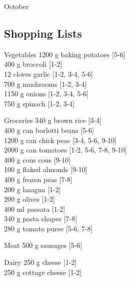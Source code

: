 \begin{menu}{October}
    \subsection*{Shopping Lists}
      \begin{shoppinglist}{Vegetables}
      1200 g baking potatoes {\scriptsize[5-6]}\\
      400 g broccoli {\scriptsize[1-2]}\\
      12 cloves garlic {\scriptsize[1-2, 3-4, 5-6]}\\
      700 g mushrooms {\scriptsize[1-2, 3-4]}\\
      1150 g onions {\scriptsize[1-2, 3-4, 5-6]}\\
      750 g spinach {\scriptsize[1-2, 3-4]}\\
      \end{shoppinglist}%
      \begin{shoppinglist}{Groceries}
      340 g brown rice {\scriptsize[3-4]}\\
      400 g can borlotti beans {\scriptsize[5-6]}\\
      1200 g can chick peas {\scriptsize[3-4, 5-6, 9-10]}\\
      2000 g can tomatoes {\scriptsize[1-2, 5-6, 7-8, 9-10]}\\
      400 g cous cous {\scriptsize[9-10]}\\
      100 g flaked almonds {\scriptsize[9-10]}\\
      400 g frozen peas {\scriptsize[7-8]}\\
      200 g lasagna {\scriptsize[1-2]}\\
      200 g olives {\scriptsize[1-2]}\\
      400 ml passata {\scriptsize[1-2]}\\
      340 g pasta shapes {\scriptsize[7-8]}\\
      280 g tomato puree {\scriptsize[5-6, 7-8]}\\
      \end{shoppinglist}%
      \par\vfil %
      \begin{shoppinglist}{Meat}
      500 g sausages {\scriptsize[5-6]}\\
      \end{shoppinglist}%
      \begin{shoppinglist}{Dairy}
      250 g cheese {\scriptsize[1-2]}\\
      250 g cottage cheese {\scriptsize[1-2]}\\

\end{shoppinglist}
\end{menu}
